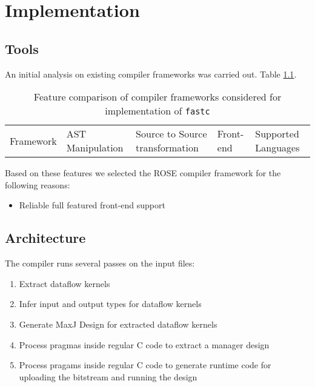 \chapter{Implementation}
\label{sec:implementation}

\section{Tools}

An initial analysis on existing compiler frameworks was carried
out. Table \ref{table:compiler-comparison}.

\begin{table}[ht!]
\begin{tabularx}{\textwidth}{X|X|X|X|X}
  Framework & AST Manipulation & Source to Source transformation & Front-end & Supported Languages \\
\end{tabularx}
\caption{Feature comparison of compiler frameworks considered for implementation of \texttt{fastc}}
\label{table:compiler-comparison}
\end{table}

Based on these features we selected the ROSE compiler framework for the following reasons:
\begin{itemize}
\item Reliable full featured front-end support
\end{itemize}


\section{Architecture}

The compiler runs several passes on the input files:

\begin{enumerate}
\item Extract dataflow kernels
\item Infer input and output types for dataflow kernels
\item Generate MaxJ Design for extracted dataflow kernels
\item Process pragmas inside regular C code to extract a manager design
\item Process pragams inside regular C code to generate runtime code for uploading the bitstream and running the design
\end{enumerate}

